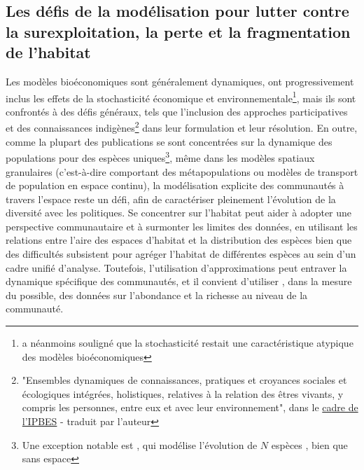 \clearpage
{}
{}
\subsection*{Les défis de la modélisation pour lutter contre la surexploitation, la perte et la fragmentation de l'habitat}

Les modèles bioéconomiques sont généralement dynamiques, ont progressivement inclus les effets de la stochasticité économique et environnementale\footnote{\cite{Drechsler20200} a néanmoins souligné que la stochasticité restait une caractéristique atypique des modèles bioéconomiques }, mais ils sont confrontés à des défis généraux, tels que l'inclusion des approches participatives et des connaissances indigènes\footnote{"Ensembles dynamiques de connaissances, pratiques et croyances sociales et écologiques intégrées, holistiques, relatives à la relation des êtres vivants, y compris les personnes, entre eux et avec leur environnement", dans le \href{https://www. ipbes.net/glossary-tag/indigenous-and-local-knowledge}{cadre de l'IPBES} - traduit par l'auteur} dans leur formulation et leur résolution. En outre, comme la plupart des publications se sont concentrées sur la dynamique des populations pour des espèces uniques\footnote{Une exception notable est \cite{brock_optimal_2002}, qui modélise l'évolution de $N$ espèces , bien que sans espace},   même dans les modèles spatiaux granulaires \citep{sanchirico_bioeconomics_1999, SANCHIRICO200523, costello_optimal_2008,brock_pattern_2010, Sanchirico2010, albers_invasive_2010, costello_private_2017} (c'est-à-dire comportant des métapopulations ou modèles de transport de population en espace continu), la modélisation explicite des communautés à travers l'espace reste un défi, afin de caractériser pleinement l'évolution de la diversité avec les politiques. Se concentrer sur l'habitat peut aider à adopter une perspective communautaire et à surmonter les limites des données, en utilisant les relations entre l'aire des espaces d'habitat et la distribution des espèces \citep{macarthur_theory_1967} bien que des difficultés subsistent pour agréger l'habitat de différentes espèces au sein d'un cadre unifié d'analyse. Toutefois, l'utilisation d'approximations peut entraver la dynamique spécifique des communautés, et il convient d'utiliser , dans la mesure du possible, des données sur l'abondance et la richesse au niveau de la communauté. 

